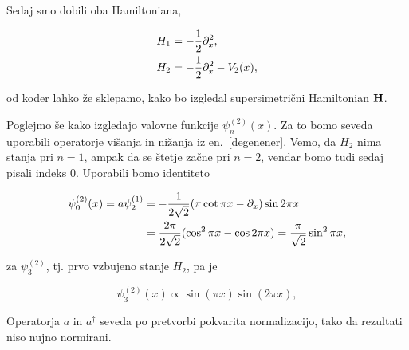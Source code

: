 Sedaj smo dobili oba Hamiltoniana,

\begin{align}
	H_1 &= -\frac{1}{2}\partial_x^2, \notag \\
	H_2 &= -\frac{1}{2}\partial_x^2 - V_2(x),
\end{align}

\ni od koder lahko \v ze sklepamo, kako bo izgledal supersimetri\v cni Hamiltonian $\mathbf{H}$.

Poglejmo \v se kako izgledajo valovne funkcije $\psi_n^{(2)}(x)$. Za to bomo seveda uporabili
operatorje vi\v sanja in ni\v zanja iz en.~\eqref{degenener}.
Vemo, da $H_2$ nima stanja pri $n = 1$, ampak da se \v stetje za\v cne pri $n = 2$, vendar bomo tudi
sedaj pisali indeks 0. Uporabili bomo identiteto

\begin{align}
	\psi_0^{(2)} (x) = a\psi_2^{(1)} &= -\frac{1}{2\sqrt{2}}(\pi \cot \pi x -
		\partial_x)\sin2\pi x \\
	&= \frac{2\pi}{2\sqrt{2}}(\cos^2\pi x - \cos 2\pi x) = \frac{\pi}{\sqrt{2}}\sin^2\pi x,
\end{align}

za $\psi_3^{(2)}$, tj. prvo vzbujeno stanje $H_2$, pa je

\begin{equation}
	\psi_3^{(2)}(x) \propto \sin (\pi x) \sin (2\pi x),
\end{equation}

\ni Operatorja $a$ in $a^\dagger$ seveda po pretvorbi pokvarita normalizacijo, tako da rezultati niso nujno
normirani.
